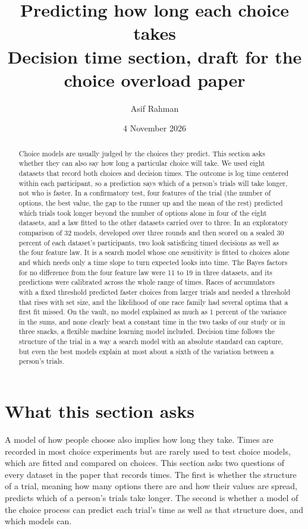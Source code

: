 \documentclass[11pt]{article}
\title{Predicting how long each choice takes\\[4pt]\large Decision time section, draft for the choice overload paper}
\author{Asif Rahman}
\date{4 November 2026}
\begin{document}
\maketitle

\begin{abstract}
\noindent Choice models are usually judged by the choices they predict. This section asks whether they can also say how long a particular choice will take. We used eight datasets that record both choices and decision times. The outcome is log time centered within each participant, so a prediction says which of a person's trials will take longer, not who is faster. In a confirmatory test, four features of the trial (the number of options, the best value, the gap to the runner up and the mean of the rest) predicted which trials took longer beyond the number of options alone in four of the eight datasets, and a law fitted to the other datasets carried over to three. In an exploratory comparison of 32 models, developed over three rounds and then scored on a sealed 30 percent of each dataset's participants, two look satisficing timed decisions as well as the four feature law. It is a search model whose one sensitivity is fitted to choices alone and which needs only a time slope to turn expected looks into time. The Bayes factors for no difference from the four feature law were 11 to 19 in three datasets, and its predictions were calibrated across the whole range of times. Races of accumulators with a fixed threshold predicted faster choices from larger trials and needed a threshold that rises with set size, and the likelihood of one race family had several optima that a first fit missed. On the vault, no model explained as much as 1 percent of the variance in the sums, and none clearly beat a constant time in the two tasks of our study or in three snacks, a flexible machine learning model included. Decision time follows the structure of the trial in a way a search model with an absolute standard can capture, but even the best models explain at most about a sixth of the variation between a person's trials.
\end{abstract}

\section{What this section asks}

A model of how people choose also implies how long they take. Times are recorded in most choice experiments but are rarely used to test choice models, which are fitted and compared on choices. This section asks two questions of every dataset in the paper that records times. The first is whether the structure of a trial, meaning how many options there are and how their values are spread, predicts which of a person's trials take longer. The second is whether a model of the choice process can predict each trial's time as well as that structure does, and which models can.
\end{document}
